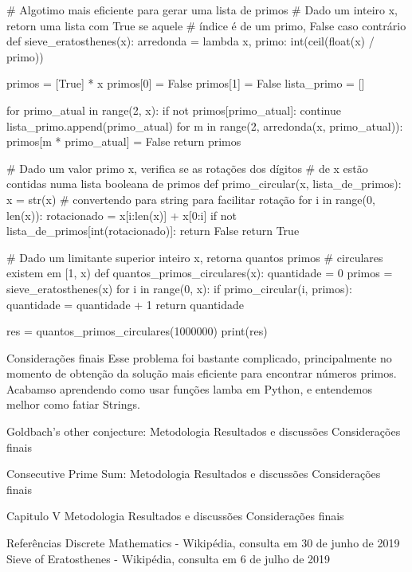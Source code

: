             # Algotimo mais eficiente para gerar uma lista de primos
            # Dado um inteiro x, retorn uma lista com True se aquele 
            # índice é de um primo, False caso contrário
            def sieve_eratosthenes(x):
                arredonda = lambda x, primo: int(ceil(float(x) / primo))

                primos = [True] * x
                primos[0] = False
                primos[1] = False
                lista_primo = []

                for primo_atual in range(2, x):
                    if not primos[primo_atual]:
                        continue
                    lista_primo.append(primo_atual)
                    for m in range(2, arredonda(x, primo_atual)):
                        primos[m * primo_atual] = False
                return primos

            # Dado um valor primo x, verifica se as rotações dos dígitos 
            # de x estão contidas numa lista booleana de primos
            def primo_circular(x, lista_de_primos):
                x = str(x) # convertendo para string para facilitar rotação
                for i in range(0, len(x)):
                    rotacionado = x[i:len(x)] + x[0:i]
                    if not lista_de_primos[int(rotacionado)]:
                        return False
                return True

            # Dado um limitante superior inteiro x, retorna quantos primos
            # circulares existem em [1, x)
            def quantos_primos_circulares(x):
                quantidade = 0
                primos = sieve_eratosthenes(x)
                for i in range(0, x):
                    if primo_circular(i, primos):
                        quantidade = quantidade + 1
                return quantidade

            res = quantos_primos_circulares(1000000)
            print(res)

        Considerações finais
            Esse problema foi bastante complicado, principalmente no momento de obtenção da solução mais eficiente para encontrar números primos. Acabamso aprendendo como usar funções lamba em Python, e entendemos melhor como fatiar Strings.
    
    Goldbach's other conjecture:
        Metodologia
        Resultados e discussões
        Considerações finais
    
    Consecutive Prime Sum:
        Metodologia
        Resultados e discussões
        Considerações finais

Capitulo V
    Metodologia
    Resultados e discussões
    Considerações finais

Referências
    Discrete Mathematics - Wikipédia, consulta em 30 de junho de 2019
    Sieve of Eratosthenes - Wikipédia, consulta em 6 de julho de 2019
